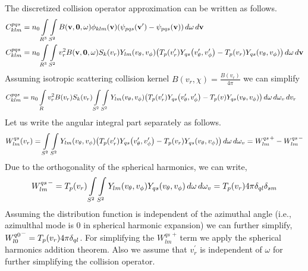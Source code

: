 \documentclass{article}[draft]
\begin{document}
The discretized collision operator approximation can be written as follows. 
\begin{align*}
C^{pqs}_{klm} &= n_0 \myint_{R^3} \myint_{S^2} B\of{\vect{v},\vect{0}, \vect{\omega}} 
\phi_{klm}\of{\vect{v}} \of{\psi_{pqs}\of{\vect{v}^\prime} -\psi_{pqs}\of{\vect{v}}} \diff{\omega}\diff{\vect{v}} \\
C^{pqs}_{klm} &= n_0 \myint_{R^3} \myint_{S^2} v_r^2 B\of{\vect{v},\vect{0}, \vect{\omega}} S_{k}\of{v_r} Y_{lm}\of{v_\theta,v_\phi }
\of{T_{p}\of{v^\prime_r} Y_{qs}\of{v^\prime_\theta, v^\prime_\phi} -T_{p}\of{v_r} Y_{qs}\of{v_\theta, v_\phi} } \diff{\omega}\diff{\vect{v}}
\end{align*} Assuming isotropic scattering collision kernel $B(v_r,\chi) = \frac{B(v_r)}{4\pi}  $ we can simplify
\begin{align*}
C^{pqs}_{klm} &= n_0 \myint_{R} v_r^2 B\of{v_r} S_k\of{v_r} 
\myint_{S^2} \myint_{S^2} Y_{lm}\of{v_\theta,v_\phi}
\of{T_{p}\of{v^\prime_r} Y_{qs}\of{v^\prime_\theta, v^\prime_\phi} - T_{p}\of{v} Y_{qs}\of{v_\theta, v_\phi}} \diff{\omega} \diff{\omega_{v}}\diff{v_r}
\end{align*} Let us write the angular integral part separately as follows. 
\begin{align*}
W^{qs}_{lm} \of{v_r}= \myint_{S^2} \myint_{S^2}  Y_{lm}\of{v_\theta,v_\phi}
\of{T_{p}\of{v^\prime_r} Y_{qs}\of{v^\prime_\theta, v^\prime_\phi} - T_{p}\of{v_r} Y_{qs}\of{v_\theta, v_\phi}} \diff{\omega} \diff{\omega_{v}} = {W^{qs}_{lm}}^+ - {W^{qs}_{lm}}^-
\end{align*}Due to the orthogonality of the spherical harmonics, we can write, 
\begin{align*}
{W^{qs}_{lm}}^- =  T_{p}\of{v_r} \myint_{S^2} \myint_{S^2}  Y_{lm}\of{v_\theta,v_\phi} Y_{qs}\of{v_\theta, v_\phi}  \diff{\omega} \diff{\omega_{v}} 
= T_p\of{v_r} 4\pi \delta_{ql} \delta_{sm}
\end{align*}
Assuming the distribution function is independent of the azimuthal angle (i.e., azimulthal mode is 0 in spherical harmonic expansion) we can further simplify, ${W^{q0}_{l0}}^-= T_p\of{v_r} 4\pi \delta_{ql}$. For simplifying the ${W^{qs}_{lm}}^+ $ term we apply the spherical harmonics addition theorem. Also we assume that $v_r^\prime$ is independent of  $\omega$ for further simplifying the collision operator. 
\end{document}
